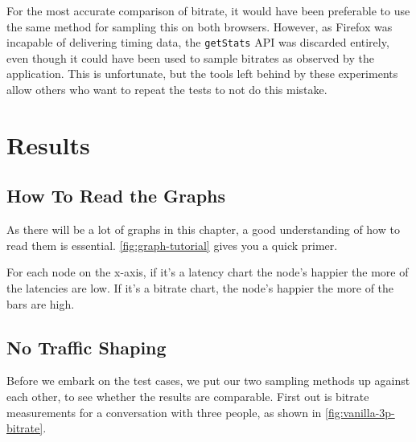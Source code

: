 For the most accurate comparison of bitrate, it would have been preferable to use the same method for sampling this on both browsers. However, as Firefox was incapable of delivering timing data, the \texttt{getStats} API was discarded entirely, even though it could have been used to sample bitrates as observed by the application. This is unfortunate, but the tools left behind by these experiments allow others who want to repeat the tests to not do this mistake.


\section{Results}

\subsection{How To Read the Graphs}

As there will be a lot of graphs in this chapter, a good understanding of how to read them is essential. \autoref{fig:graph-tutorial} gives you a quick primer.


For each node on the x-axis, if it's a latency chart the node's happier the more of the latencies are low. If it's a bitrate chart, the node's happier the more of the bars are high.


\subsection{No Traffic Shaping}

Before we embark on the test cases, we put our two sampling methods up against each other, to see whether the results are comparable. First out is bitrate measurements for a conversation with three people, as shown in \autoref{fig:vanilla-3p-bitrate}.

